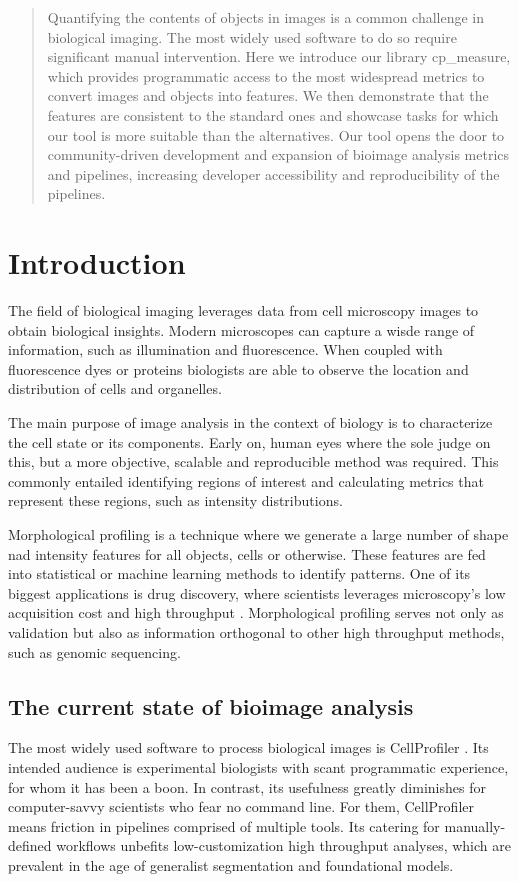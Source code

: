 \documentclass{article}
\begin{document}
\begin{abstract}
Quantifying the contents of objects in images is a common challenge in biological imaging. The most widely used software to do so require significant manual intervention. Here we introduce our library cp\_measure, which provides programmatic access to the most widespread metrics to convert images and objects into features. We then demonstrate that the features are consistent to the standard ones and showcase tasks for which our tool is more suitable than the alternatives. Our tool opens the door to community-driven  development and expansion of bioimage analysis metrics and pipelines, increasing developer accessibility and reproducibility of the pipelines.
\end{abstract}
\section{Introduction}
\label{sec:org4c9ba67}
The field of biological imaging leverages data from cell microscopy images to obtain biological insights. Modern microscopes can capture a wisde range of information, such as illumination and fluorescence. When coupled with fluorescence dyes or proteins biologists are able to observe the location and distribution of cells and organelles.

The main purpose of image analysis in the context of biology is to characterize the cell state or its components. Early on, human eyes where the sole judge on this, but a more objective, scalable and reproducible method was required. This commonly entailed identifying regions of interest and calculating metrics that represent these regions, such as intensity distributions.

Morphological profiling is a technique where we generate a large number of shape nad intensity features for all objects, cells or otherwise. These features are fed into statistical or machine learning methods to identify patterns. One of its biggest applications is drug discovery, where scientists leverages microscopy's low acquisition cost and high throughput \citep{sealDecadeSystematicReview2024}. Morphological profiling serves not only as validation but also as information orthogonal to other high throughput methods, such as genomic sequencing.
\subsection{The current state of bioimage analysis}
\label{sec:org8f5b33d}
The most widely used software to process biological images is CellProfiler \citep{stirlingCellProfiler4Improvements2021}. Its intended audience is experimental biologists with scant programmatic experience, for whom it has been a boon. In contrast, its usefulness greatly diminishes for computer-savvy scientists who fear no command line. For them, CellProfiler means friction in pipelines comprised of multiple tools. Its catering for manually-defined workflows unbefits low-customization high throughput analyses, which are prevalent in the age of generalist segmentation and foundational models.
\end{document}
